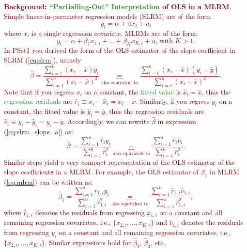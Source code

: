 \documentclass{article}
\begin{document}
\noindent \textcolor{Maroon}{\textbf{Background: \textcolor{ForestGreen}{``Partialling-Out'' Interpretation} of OLS in a MLRM}. Simple linear-in-parameter regression models (SLRM) are of the form 
\begin{equation}\label{eq:slrm}
y_i=\alpha+\beta x_i + u_i 
\end{equation}
where $x_i$ is a single regression covariate. MLRMs are of the form:
\begin{equation}\label{eq:mlrm}
y_i=\alpha+\beta_1 x_{1,i} + \dots + \beta_K x_{K,i} +u_i \text{ with } K>1.
\end{equation}
\noindent In PSet1 you derived the form of the OLS estimator of the slope coefficient in SLRM (\ref{eq:slrm}), namely 
\begin{equation}\label{eq:slrm_slope_a}
\hat{\beta}=\frac{\sum_{i=1}^{n}(x_i-\bar{x})y_i}{\sum_{i=1}^{n}(x_i-\bar{x})^2} \underbrace{=}_{\text{also equivalent to}} \frac{\sum_{i=1}^{n}(x_i-\bar{x})(y_i-\bar{y})}{\sum_{i=1}^{n}(x_i-\bar{x})^2}.
\end{equation}
Note that if you regress $x_i$ on a constant, the \textcolor{ForestGreen}{fitted value} is $\hat{x}_i=\bar{x}$, thus the \textcolor{ForestGreen}{regression residuals} are $\hat{r}_i \equiv x_i-\hat{x}_i=x_i-\bar{x}$. Similarly, if you regress $y_i$ on a constant, the fitted value is $\hat{y}_i=\bar{y}$, thus the regression residuals are $\hat{v}_i \equiv y_i-\hat{y}_i=y_i-\bar{y}$. Accordingly, we can rewrite $\hat{\beta}$ in expression (\ref{eq:slrm_slope_a}) as:
\begin{equation}\label{eq:slrm_slope_b}
\hat{\beta}=\frac{\sum_{i=1}^{n}\hat{r}_i y_i}{\sum_{i=1}^{n}\hat{r}_i^2} \underbrace{=}_{\text{also equivalent to}} \frac{\sum_{i=1}^{n}\hat{r}_i \hat{v}_i}{\sum_{i=1}^{n}\hat{r}_i^2}.
\end{equation}
Similar steps yield a very compact representation of the OLS estimator of the slope coefficient\textbf{s} in a MLRM. For example, the OLS estimator of $\beta_1$ in MLRM (\ref{eq:mlrm}) can be written as: 
\begin{equation}\label{eq:mlrm_slope_b}
\hat{\beta}_1=\frac{\sum_{i=1}^{n}\hat{r}_{1,i}y_i}{\sum_{i=1}^{n}\hat{r}_{1,i}^2} \underbrace{=}_{\text{also equivalent to}} \frac{\sum_{i=1}^{n}\hat{r}_{1,i}\hat{v}_{1,i}}{\sum_{i=1}^{n}\hat{r}_{1,i}^2},
\end{equation}
where $\hat{r}_{1,i}$ denotes the residuals from regressing $x_{1,i}$ on a constant and all remaining regression covariates, i.e., $\{x_{2,i},\ldots,x_{K,i} \}$ and $\hat{v}_{1,i}$ denotes the residuals from regressing $y_{i}$ on a constant and all remaining regression covariates, i.e., $\{x_{2,i},\ldots,x_{K,i} \}$. Similar expressions hold for $\hat{\beta}_2$, $\hat{\beta}_3$, etc.}
\end{document}
